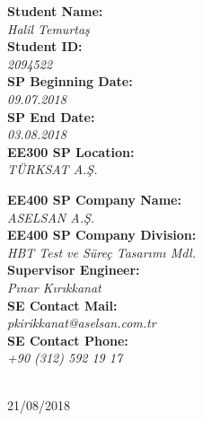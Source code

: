 \begin{titlepage}

\begin{minipage}{0.38\textwidth}
\begin{flushleft} \large
	\textbf{Student Name:} \\
		\textit{Halil Temurtaş} \\
	\textbf{Student ID:} \\ 
		\textit{2094522} \\
	\textbf{SP Beginning Date:} \\
		\textit{09.07.2018} \\
	\textbf{SP End Date:}\\
		\textit{03.08.2018} \\
	\textbf{EE300 SP Location:} \\ 
		\textit{TÜRKSAT A.Ş.} 
\end{flushleft}
\end{minipage}
\begin{minipage}{0.6\textwidth}
\begin{flushright} \large
	\textbf{EE400 SP Company Name:} \\ 
		\textit{ASELSAN A.Ş.} \\
	\textbf{EE400 SP Company Division:} \\ 
		\textit{HBT Test ve Süreç Tasarımı Mdl.} \\
	\textbf{Supervisor Engineer:} \\
		\textit{Pınar Kırıkkanat} \\
	\textbf{SE Contact Mail:} \\
		\textit{pkirikkanat@aselsan.com.tr}  \\
	\textbf{SE Contact Phone:} \\
		\textit{+90 (312) 592 19 17 } 
\end{flushright}
\end{minipage}\\[0.8cm]



{\large 21/08/2018}\\[1cm] %


\vfill %

\end{titlepage}


